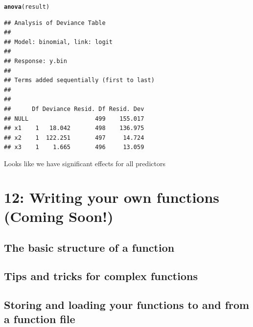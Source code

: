 \documentclass{tufte-book}\usepackage[]{graphicx}\usepackage[]{color}
\makeatletter
\newcommand{\hlstd}[1]{\textcolor[rgb]{0.345,0.345,0.345}{#1}}%
\newcommand{\hlkwd}[1]{\textcolor[rgb]{0.737,0.353,0.396}{\textbf{#1}}}%
\newenvironment{kframe}{%
 \def\at@end@of@kframe{}%
 \ifinner\ifhmode%
  \def\at@end@of@kframe{\end{minipage}}%
  \begin{minipage}{\columnwidth}%
 \fi\fi%
 \def\FrameCommand##1{\hskip\@totalleftmargin \hskip-\fboxsep
 \colorbox{shadecolor}{##1}\hskip-\fboxsep
     \hskip-\linewidth \hskip-\@totalleftmargin \hskip\columnwidth}%
 \MakeFramed {\advance\hsize-\width
   \@totalleftmargin\z@ \linewidth\hsize
   \@setminipage}}%
 {\par\unskip\endMakeFramed%
 \at@end@of@kframe}
\newenvironment{knitrout}{}{} %
\makeatother
\begin{document}
\begin{footnotesize}
\begin{footnotesize}
\begin{knitrout}
\color{fgcolor}\begin{kframe}
\begin{alltt}
\hlkwd{anova}\hlstd{(result)}
\end{alltt}


{\ttfamily\noindent\color{warningcolor}{\#\# Warning: glm.fit: fitted probabilities numerically 0 or 1 occurred}}\begin{verbatim}
## Analysis of Deviance Table
## 
## Model: binomial, link: logit
## 
## Response: y.bin
## 
## Terms added sequentially (first to last)
## 
## 
##      Df Deviance Resid. Df Resid. Dev
## NULL                   499    155.017
## x1    1   18.042       498    136.975
## x2    1  122.251       497     14.724
## x3    1    1.665       496     13.059
\end{verbatim}
\end{kframe}
\end{knitrout}
\end{footnotesize}

Looks like we have significant effects for all predictors


\chapter{12: Writing your own functions (Coming Soon!)}
\label{ch:12}


\section{The basic structure of a function}
\section{Tips and tricks for complex functions}
\section{Storing and loading your functions to and from a function file}


\end{footnotesize}
\end{document}
